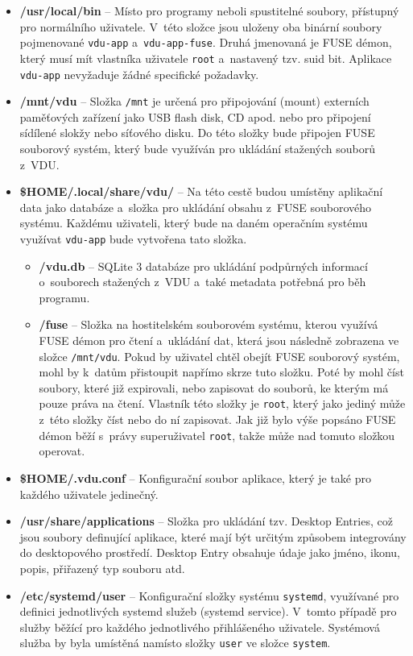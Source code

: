 \begin{itemize}
    \item \textbf{/usr/local/bin} – Místo pro programy neboli spustitelné soubory, přístupný pro normálního uživatele. \cite{LinuxHierarchy} V této složce jsou uloženy
    oba binární soubory pojmenované \texttt{vdu-app} a \texttt{vdu-app-fuse}. Druhá jmenovaná je FUSE démon, který musí mít vlastníka uživatele \texttt{root} a nastavený
    tzv. suid bit. Aplikace \texttt{vdu-app} nevyžaduje žádné specifické požadavky. 
    \item \textbf{/mnt/vdu} – Složka \texttt{/mnt} je určená pro připojování (mount) externích paměťových zařízení jako USB flash disk, CD apod. nebo pro připojení
    sídílené slokžy nebo síťového disku. Do této složky bude připojen FUSE souborový systém, který bude využíván pro ukládání stažených souborů z VDU.
    \item \textbf{\$HOME/.local/share/vdu/} – Na této cestě budou umístěny aplikační data jako databáze a složka pro ukládání obsahu z FUSE souborového systému.
    Každému uživateli, který bude na daném operačním systému využívat \texttt{vdu-app} bude vytvořena tato složka.
    \begin{itemize}
        \item \textbf{/vdu.db} – SQLite 3 databáze pro ukládání podpůrných informací o souborech stažených z VDU a také metadata potřebná pro běh programu.
        \item \textbf{/fuse} – Složka na hostitelském souborovém systému, kterou využívá FUSE démon pro čtení a ukládání dat, která jsou následně zobrazena
        ve složce \texttt{/mnt/vdu}. Pokud by uživatel chtěl obejít FUSE souborový systém, mohl by k datům přistoupit napřímo skrze tuto složku. Poté by mohl
        číst soubory, které již expirovali, nebo zapisovat do souborů, ke kterým má pouze práva na čtení. Vlastník této složky je \texttt{root}, který jako
        jediný může z této složky číst nebo do ní zapisovat. Jak již bylo výše popsáno FUSE démon běží s právy superuživatel \texttt{root}, takže může nad tomuto
        složkou operovat.
    \end{itemize}
    \item \textbf{\$HOME/.vdu.conf} – Konfigurační soubor aplikace, který je také pro každého uživatele jedinečný.
    \item \textbf{/usr/share/applications} – Složka pro ukládání tzv. Desktop Entries, což jsou soubory definující aplikace, které mají být určitým způsobem integrovány
    do desktopového prostředí. Desktop Entry obsahuje údaje jako jméno, ikonu, popis, přiřazený typ souboru atd. \cite{DesktopEntrySpecification}
    \item \textbf{/etc/systemd/user} – Konfigurační složky systému \texttt{systemd}, využívané pro definici jednotlivých systemd služeb (systemd service). V tomto 
    případě pro služby běžící pro každého jednotlivého přihlášeného uživatele. Systémová služba by byla umístěná namísto složky \texttt{user} ve složce \texttt{system}. \cite{systemd-user}
\end{itemize}

